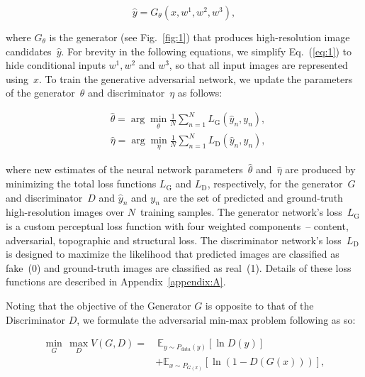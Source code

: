 \documentclass[tc, noline]{copernicus}
\begin{document}
\begin{equation}\label{eq:1}
  \hat{y} = G_\theta(x, w^1, w^2, w^3),
\end{equation}

where $G_\theta$ is the generator (see Fig.~\ref{fig:1}) that produces high-resolution image candidates~$\hat{y}$.
For brevity in the following equations, we simplify Eq.~(\ref{eq:1}) to hide conditional inputs $w^1, w^2$ and  $w^3$, so that all input images are represented using~$x$.
To train the generative adversarial network, we update the parameters of the generator~$\theta$ and discriminator~$\eta$ as follows:

\begin{align}
  &\hat{\theta} = \arg\min_{\theta} \frac{1}{N}\sum_{n=1}^{N}L_{\mathrm{G}}(\hat{y}_n, y_n), \label{eq:2}\\
  &\hat{\eta} = \arg\min_{\eta} \frac{1}{N}\sum_{n=1}^{N}L_{\mathrm{D}}(\hat{y}_n, y_n), \label{eq:3}
\end{align}

where new estimates of the neural network parameters~$\hat{\theta}$ and~$\hat{\eta}$ are produced by minimizing the total loss functions $L_{\mathrm{G}}$ and $L_{\mathrm{D}}$, respectively, for the generator~$G$ and discriminator~$D$ and $\hat{y}_n$ and $y_n$ are the set of predicted and ground-truth high-resolution images over $N$~training samples.
The generator network's loss~$L_{\mathrm{G}}$ is a custom perceptual loss function with four weighted components~-- content, adversarial, topographic and structural loss.
The discriminator network's loss~$L_{\mathrm{D}}$ is designed to maximize the likelihood that predicted images are classified as fake~(0) and ground-truth images are classified as real~(1).
Details of these loss functions are described in Appendix~\ref{appendix:A}.

Noting that the objective of the Generator $G$ is opposite to that of the Discriminator $D$, we formulate the adversarial min-max problem following \citet{GoodfellowGenerativeAdversarialNetworks2014} as so:

\begin{equation}\label{eq:4}
  \begin{split}
  \min_{G}\,\max_{D} V(G,D) =&~\mathbb{E}_{y \sim P_{\text{data}}(y)}[\ln D(y)]\\
  &+ \mathbb{E}_{x \sim P_{G(x)}}[\ln(1-D(G(x)))],
  \end{split}
\end{equation}
\end{document}
